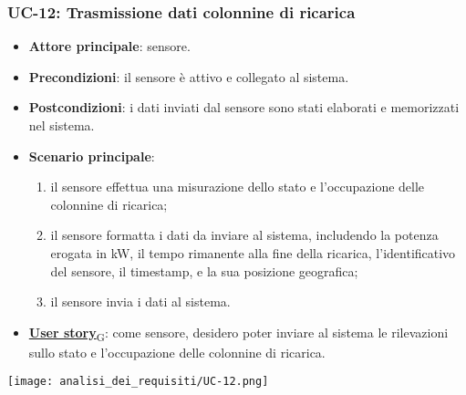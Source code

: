 \subsubsection{UC-12: Trasmissione dati colonnine di ricarica}
\begin{itemize}
	\item \textbf{Attore principale}: sensore.
	\item \textbf{Precondizioni}: il sensore è attivo e collegato al sistema.
	\item \textbf{Postcondizioni}: i dati inviati dal sensore sono stati elaborati e memorizzati nel sistema.
	\item \textbf{Scenario principale}:
	      \begin{enumerate}
		      \item il sensore effettua una misurazione dello stato e l'occupazione delle colonnine di ricarica;
		      \item il sensore formatta i dati da inviare al sistema, includendo la potenza erogata in kW, il tempo rimanente alla fine della ricarica, l'identificativo del sensore,
		            il timestamp, e la sua posizione geografica;
		      \item il sensore invia i dati al sistema.
	      \end{enumerate}
	\item \href{https://7last.github.io/docs/pb/documentazione-interna/glossario\#user-story}{\textbf{User story}\textsubscript{G}}:
	      come sensore, desidero poter inviare al sistema le rilevazioni sullo stato e l'occupazione delle colonnine di ricarica.
\end{itemize}
\begin{center}
	\texttt{[image: analisi\_dei\_requisiti/UC-12.png]}
\end{center}


